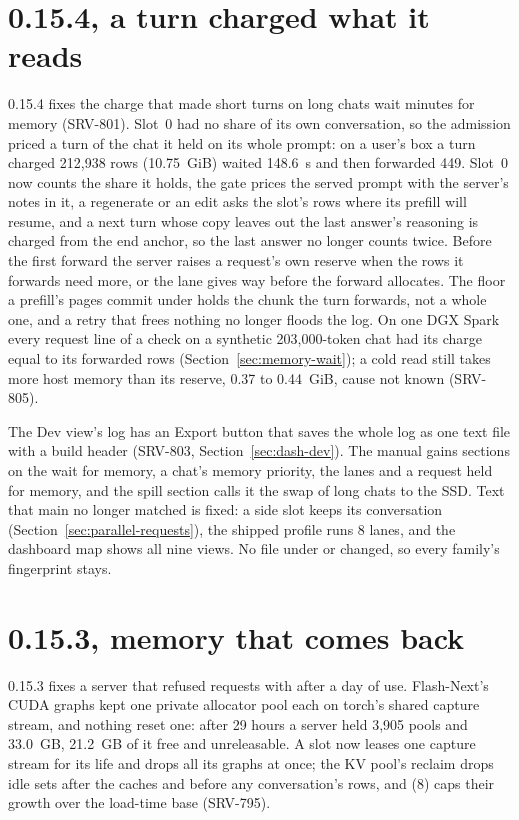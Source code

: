 \section{0.15.4, a turn charged what it reads}\label{sec:changelog-0154}

0.15.4 fixes the charge that made short turns on long chats wait minutes for memory (SRV-801). Slot~0 had no share of its own conversation, so the admission priced a turn of the chat it held on its whole prompt: on a user's box a turn charged 212,938 rows (10.75~GiB) waited 148.6~s and then forwarded 449. Slot~0 now counts the share it holds, the gate prices the served prompt with the server's notes in it, a regenerate or an edit asks the slot's rows where its prefill will resume, and a next turn whose copy leaves out the last answer's reasoning is charged from the end anchor, so the last answer no longer counts twice. Before the first forward the server raises a request's own reserve when the rows it forwards need more, or the lane gives way before the forward allocates. The floor a prefill's pages commit under holds the chunk the turn forwards, not a whole one, and a retry that frees nothing no longer floods the log. On one DGX Spark every request line of a check on a synthetic 203,000-token chat had its charge equal to its forwarded rows (Section~\ref{sec:memory-wait}); a cold read still takes more host memory than its reserve, 0.37 to 0.44~GiB, cause not known (SRV-805).

The Dev view's log has an Export button that saves the whole log as one text file with a build header (SRV-803, Section~\ref{sec:dash-dev}). The manual gains sections on the wait for memory, a chat's memory priority, the lanes and a request held for memory, and the spill section calls it the swap of long chats to the SSD. Text that main no longer matched is fixed: a side slot keeps its conversation (Section~\ref{sec:parallel-requests}), the shipped profile runs 8 lanes, and the dashboard map shows all nine views. No file under  or  changed, so every family's fingerprint stays.

\section{0.15.3, memory that comes back}\label{sec:changelog-0153}

0.15.3 fixes a server that refused requests with  after a day of use. Flash-Next's CUDA graphs kept one private allocator pool each on torch's shared capture stream, and nothing reset one: after 29 hours a server held 3,905 pools and 33.0~GB, 21.2~GB of it free and unreleasable. A slot now leases one capture stream for its life and drops all its graphs at once; the KV pool's reclaim drops idle sets after the caches and before any conversation's rows, and  (8) caps their growth over the load-time base (SRV-795).

